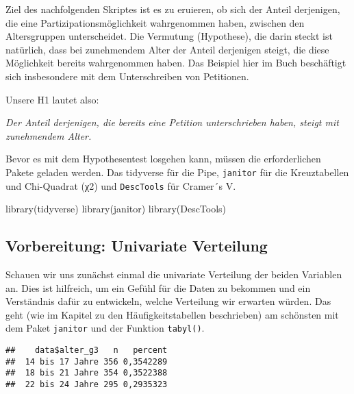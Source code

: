 \documentclass[
]{book}
\newenvironment{Shaded}{\begin{snugshade}}{\end{snugshade}}
\newcommand{\CommentTok}[1]{\textcolor[rgb]{0.56,0.35,0.01}{\textit{#1}}}
\newcommand{\FunctionTok}[1]{\textcolor[rgb]{0.00,0.00,0.00}{#1}}
\newcommand{\NormalTok}[1]{#1}
\newcommand{\SpecialCharTok}[1]{\textcolor[rgb]{0.00,0.00,0.00}{#1}}
\begin{document}
Ziel des nachfolgenden Skriptes ist es zu eruieren, ob sich der Anteil derjenigen, die eine Partizipationsmöglichkeit wahrgenommen haben, zwischen den Altersgruppen unterscheidet. Die Vermutung (Hypothese), die darin steckt ist natürlich, dass bei zunehmendem Alter der Anteil derjenigen steigt, die diese Möglichkeit bereits wahrgenommen haben. Das Beispiel hier im Buch beschäftigt sich insbesondere mit dem Unterschreiben von Petitionen.

Unsere H1 lautet also:

\emph{Der Anteil derjenigen, die bereits eine Petition unterschrieben haben, steigt mit zunehmendem Alter.}

Bevor es mit dem Hypothesentest losgehen kann, müssen die erforderlichen Pakete geladen werden. Das tidyverse für die Pipe, \texttt{janitor} für die Kreuztabellen und Chi-Quadrat (χ2) und \texttt{DescTools} für Cramer´s V.

\begin{Shaded}
\begin{Highlighting}[]
\FunctionTok{library}\NormalTok{(tidyverse)}
\FunctionTok{library}\NormalTok{(janitor)}
\FunctionTok{library}\NormalTok{(DescTools)}
\end{Highlighting}
\end{Shaded}

\hypertarget{vorbereitung-univariate-verteilung}{%
\subsection{Vorbereitung: Univariate Verteilung}\label{vorbereitung-univariate-verteilung}}

Schauen wir uns zunächst einmal die univariate Verteilung der beiden Variablen an.
Dies ist hilfreich, um ein Gefühl für die Daten zu bekommen und ein Verständnis dafür zu entwickeln, welche Verteilung wir erwarten würden.
Das geht (wie im Kapitel zu den Häufigkeitstabellen beschrieben) am schönsten mit dem Paket \texttt{janitor} und der Funktion \texttt{tabyl()}.

\begin{Shaded}
\end{Shaded}

\begin{verbatim}
##    data$alter_g3   n   percent
##  14 bis 17 Jahre 356 0,3542289
##  18 bis 21 Jahre 354 0,3522388
##  22 bis 24 Jahre 295 0,2935323
\end{verbatim}
\end{document}
